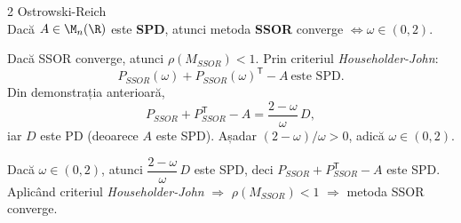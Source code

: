 \begin{teorema}{2 Ostrowski-Reich}
    \text{ }\\[0.5em]
    Dacă $A \in \M_n(\R)$ este \textbf{SPD}, atunci metoda \textbf{SSOR} converge $\Leftrightarrow \omega \in (0,2)$.
\end{teorema}

\begin{demonstratie} 
    Dacă SSOR converge, atunci $\rho(M_{SSOR})<1$.
    Prin criteriul \emph{Householder-John}:
    $$
    P_{SSOR}(\omega)+P_{SSOR}(\omega)^{\mathsf T}-A\ \text{este SPD}.
    $$
    Din demonstrația anterioară,
    $$
    P_{SSOR}+P_{SSOR}^{\mathsf T}-A=\frac{2-\omega}{\omega}\,D,
    $$
    iar $D$ este PD (deoarece $A$ este SPD). Așadar $(2-\omega)/\omega>0$, adică $\omega\in(0,2)$.

    Dacă $\omega\in(0,2)$, atunci $\dfrac{2-\omega}{\omega}\,D$ este SPD, deci $P_{SSOR}+P_{SSOR}^{\mathsf T}-A$ este SPD. Aplicând criteriul \emph{Householder-John} $\Rightarrow$ $\rho(M_{SSOR})<1$ $\Rightarrow$ metoda SSOR converge.

\end{demonstratie}